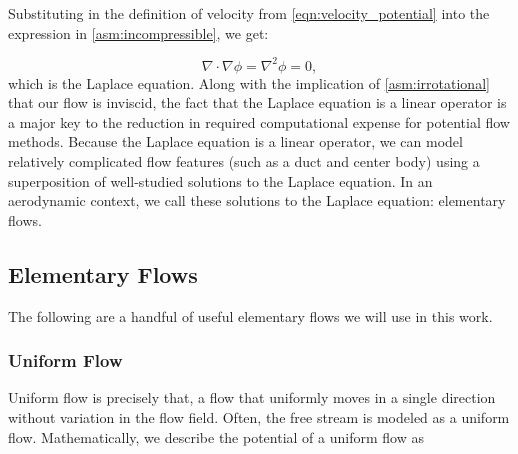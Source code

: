 \begin{assumption}{}
    \label{asm:incompressible}

    \vspace*{-\baselineskip}



\end{assumption}

Substituting in the definition of velocity from \cref{eqn:velocity_potential} into the expression in \cref{asm:incompressible}, we get:

\begin{equation}
    \label{eqn:laplace}
    \nabla \cdot \nabla \phi = \nabla^2 \phi = 0,
\end{equation}
%
which is the Laplace equation.
%
Along with the implication of \cref{asm:irrotational} that our flow is inviscid, the fact that the Laplace equation is a linear operator is a major key to the reduction in required computational expense for potential flow methods.
%
Because the Laplace equation is a linear operator, we can model relatively complicated flow features (such as a duct and center body) using a superposition of well-studied solutions to the Laplace equation.
%
In an aerodynamic context, we call these solutions to the Laplace equation: elementary flows.

\subsection{Elementary Flows}
\label{ssec:elemflows}

The following are a handful of useful elementary flows we will use in this work.

\subsubsection{Uniform Flow}
\begin{marginfigure}
    
\end{marginfigure}
Uniform flow is precisely that, a flow that uniformly moves in a single direction without variation in the flow field.
%
Often, the free stream is modeled as a uniform flow.
%
Mathematically, we describe the potential of a uniform flow as

